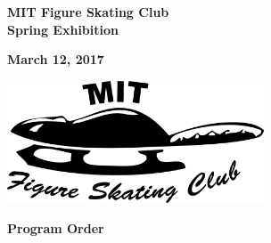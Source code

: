 \documentclass[12pt]{article}
\begin{document}
\begin{multicols*}{2}
\vfill\null

\columnbreak






\begin{center}



\vspace*{1.5in}



{\Large \textbf{MIT Figure Skating Club}}\\

{\Large \textbf{Spring Exhibition}}



\vspace{0.2in}



{\large \textbf{March 12, 2017}}



\vspace{0.7in}



\includegraphics[width=3in]{fsclogo.png}



\end{center}



\vfill\null

\columnbreak






\begin{center}



{\large \textbf{Program Order}}




\end{center}
\end{multicols*}
\end{document}
